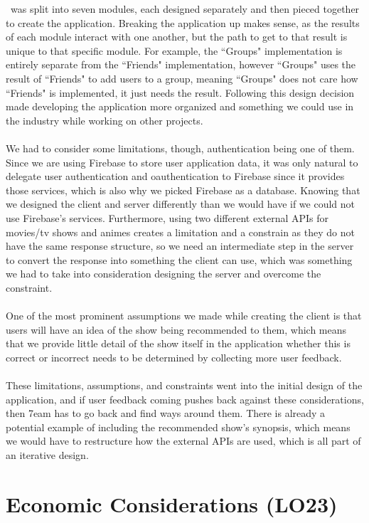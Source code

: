 \documentclass{article}
\begin{document}
\noindent \progname ~was split into seven modules, each designed separately and then pieced together to create the application. Breaking the application up makes sense, as the results of each module interact with one another, but the path to get to that result is unique to that specific module. For example, the ``Groups" implementation is entirely separate from the ``Friends" implementation, however ``Groups" uses the result of ``Friends" to add users to a group, meaning ``Groups" does not care how ``Friends" is implemented, it just needs the result. Following this design decision made developing the application more organized and something we could use in the industry while working on other projects.
\\~\\ We had to consider some limitations, though, authentication being one of them. Since we are using Firebase to store user application data, it was only natural to delegate user authentication and oauthentication to Firebase since it provides those services, which is also why we picked Firebase as a database. Knowing that we designed the client and server differently than we would have if we could not use Firebase's services. Furthermore, using two different external APIs for movies/tv shows and animes creates a limitation and a constrain as they do not have the same response structure, so we need an intermediate step in the server to convert the response into something the client can use, which was something we had to take into consideration designing the server and overcome the constraint.
\\~\\ One of the most prominent assumptions we made while creating the client is that users will have an idea of the show being recommended to them, which means that we provide little detail of the show itself in the application whether this is correct or incorrect needs to be determined by collecting more user feedback.
\\~\\ These limitations, assumptions, and constraints went into the initial design of the application, and if user feedback coming pushes back against these considerations, then 7eam has to go back and find ways around them. There is already a potential example of including the recommended show's synopsis, which means we would have to restructure how the external APIs are used, which is all part of an iterative design.

\section{Economic Considerations (LO23)}
\end{document}
